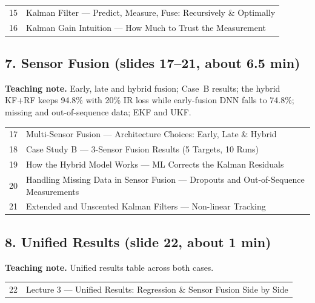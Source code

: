 \documentclass[11pt]{article}
\begin{document}
\begin{center}\small\renewcommand{\arraystretch}{1.1}\begin{tabularx}{\textwidth}{@{}r X@{}}15 & Kalman Filter --- Predict, Measure, Fuse: Recursively \& Optimally\\
16 & Kalman Gain Intuition --- How Much to Trust the Measurement\\\end{tabularx}\end{center}

\subsection{7. Sensor Fusion \normalfont\small\color{GreyN}(slides 17--21, about 6.5 min)}

\textbf{Teaching note.} Early, late and hybrid fusion; Case~B results; the hybrid KF+RF keeps 94.8\% with 20\% IR loss while early-fusion DNN falls to 74.8\%; missing and out-of-sequence data; EKF and UKF.

\begin{center}\small\renewcommand{\arraystretch}{1.1}\begin{tabularx}{\textwidth}{@{}r X@{}}17 & Multi-Sensor Fusion --- Architecture Choices: Early, Late \& Hybrid\\
18 & Case Study B --- 3-Sensor Fusion Results (5 Targets, 10 Runs)\\
19 & How the Hybrid Model Works --- ML Corrects the Kalman Residuals\\
20 & Handling Missing Data in Sensor Fusion --- Dropouts and Out-of-Sequence Measurements\\
21 & Extended and Unscented Kalman Filters --- Non-linear Tracking\\\end{tabularx}\end{center}

\subsection{8. Unified Results \normalfont\small\color{GreyN}(slide 22, about 1 min)}

\textbf{Teaching note.} Unified results table across both cases.

\begin{center}\small\renewcommand{\arraystretch}{1.1}\begin{tabularx}{\textwidth}{@{}r X@{}}22 & Lecture 3 --- Unified Results: Regression \& Sensor Fusion Side by Side\\\end{tabularx}\end{center}
\end{document}
